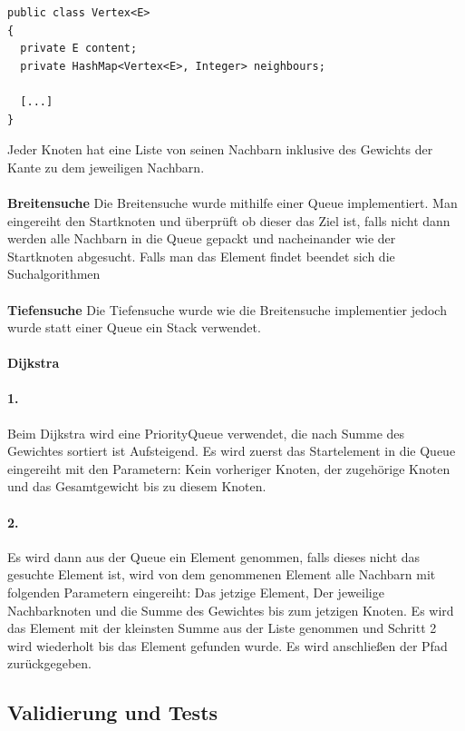 \documentclass[utf8]{article}
\begin{document}
\begin{verbatim}
public class Vertex<E>
{
  private E content;
  private HashMap<Vertex<E>, Integer> neighbours;

  [...]
}
\end{verbatim}
Jeder Knoten hat eine Liste von seinen Nachbarn inklusive des 
Gewichts der Kante zu dem jeweiligen Nachbarn.\\\\
\textbf{Breitensuche} \label{Breitensuche}
Die Breitensuche wurde mithilfe einer Queue implementiert.
Man eingereiht den Startknoten und überprüft ob dieser das Ziel ist,
falls nicht dann werden alle Nachbarn in die Queue gepackt und nacheinander
wie der Startknoten abgesucht. Falls man das Element findet beendet sich die Suchalgorithmen\\
\\
\textbf{Tiefensuche}
Die Tiefensuche wurde wie die Breitensuche implementier jedoch wurde
statt einer Queue ein Stack verwendet. \\
\\
\textbf{Dijkstra}
\paragraph{1.}
Beim Dijkstra wird eine PriorityQueue verwendet, die nach
Summe des Gewichtes sortiert ist Aufsteigend. 
Es wird zuerst das Startelement in die Queue eingereiht 
mit den Parametern: Kein vorheriger Knoten, 
der zugehörige Knoten und das Gesamtgewicht bis zu diesem Knoten.
\paragraph{2.} Es wird dann aus der Queue ein Element genommen, falls dieses nicht das gesuchte
Element ist, wird von dem genommenen Element alle Nachbarn mit folgenden
Parametern eingereiht: Das jetzige Element, Der jeweilige Nachbarknoten
und die Summe des Gewichtes bis zum jetzigen Knoten. Es wird das Element mit der kleinsten Summe
aus der Liste genommen und Schritt 2 wird wiederholt bis das Element
gefunden wurde. Es wird anschließen der Pfad zurückgegeben.

\subsection{Validierung und Tests}
\end{document}
